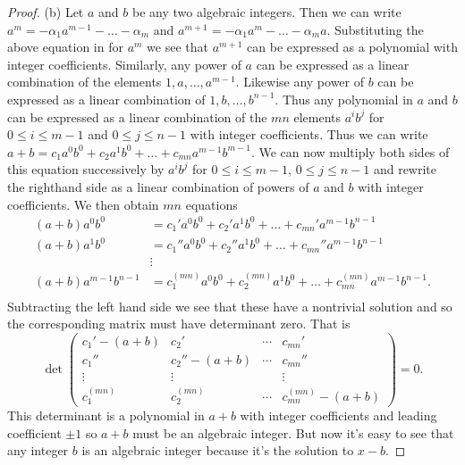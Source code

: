 \documentclass{article}
\begin{document}
\begin{proof}
(b) Let $a$ and $b$ be any two algebraic integers. Then we can write $a^m = -\alpha_1 a^{m-1} - \dots - \alpha_m$ and $a^{m+1} = -\alpha_1 a^m - \dots - \alpha_m a$. Substituting the above equation in for $a^m$ we see that $a^{m+1}$ can be expressed as a polynomial with integer coefficients. Similarly, any power of $a$ can be expressed as a linear combination of the elements $1, a, \dots , a^{m-1}$. Likewise any power of $b$ can be expressed as a linear combination of $1, b, \dots , b^{n-1}$. Thus any polynomial in $a$ and $b$ can be expressed as a linear combination of the $mn$ elements $a^ib^j$ for $0 \leq i \leq m-1$ and $0 \leq j \leq n-1$ with integer coefficients. Thus we can write $a + b = c_1a^0b^0 + c_2a^1b^0 + \dots + c_{mn}a^{m-1}b^{m-1}$. We can now multiply both sides of this equation successively by $a^ib^j$ for $0 \leq i \leq m-1$, $0 \leq j \leq n-1$ and rewrite the righthand side as a linear combination of powers of $a$ and $b$ with integer coefficients. We then obtain $mn$ equations
\begin{align*}
(a+b)a^0b^0 &= c_1'a^0b^0 + c_2'a^1b^0 + \dots + c_{mn}'a^{m-1}b^{n-1}\\
(a+b)a^1b^0 &= c_1''a^0b^0 + c_2''a^1b^0 + \dots + c_{mn}''a^{m-1}b^{n-1}\\
&\vdots \\
(a+b)a^{m-1}b^{n-1} &= c_1^{(mn)}a^0b^0 + c_2^{(mn)}a^1b^0 + \dots + c_{mn}^{(mn)}a^{m-1}b^{n-1}.\\
\end{align*}
Subtracting the left hand side we see that these have a nontrivial solution and so the corresponding matrix must have determinant zero. That is
\[
\det \left (
\begin{array}{cccc}
c_1'-(a+b) & c_2' & \cdots & c_{mn}'\\
c_1'' & c_2'' - (a+b) & \cdots & c_{mn}''\\
\vdots & \vdots && \vdots\\
c_1^{(mn)} & c_2^{(mn)} & \cdots & c_{mn}^{(mn)} - (a+b)
\end{array}
\right )
= 0.
\]
This determinant is a polynomial in $a+b$ with integer coefficients and leading coefficient $\pm 1$ so $a+b$ must be an algebraic integer. But now it's easy to see that any integer $b$ is an algebraic integer because it's the solution to $x-b$.
\end{proof}
\end{document}
